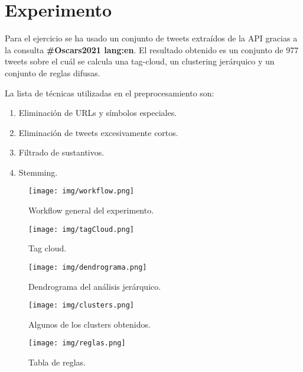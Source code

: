 \documentclass[13pt,a4paper]{article}
\begin{document}
    
    
    \newpage


\section{Experimento}

Para el ejercicio se ha usado un conjunto de tweets extraídos de la API gracias a la consulta \textbf{\#Oscars2021 lang:en}. El resultado obtenido es un conjunto de 977 tweets sobre el cuál se calcula una tag-cloud, un clustering jerárquico y un conjunto de reglas difusas.

\vspace{\baselineskip}

La lista de técnicas utilizadas en el preprocesamiento son:
\begin{enumerate}
    \item Eliminación de URLs y símbolos especiales.
    \item Eliminación de tweets excesivamente cortos.
    \item Filtrado de sustantivos.
    \item Stemming.
\end{enumerate}

\vspace{\baselineskip}

\begin{figure}[H]\center\texttt{[image: img/workflow.png]}\caption{Workflow general del experimento.}\end{figure}

\begin{figure}[H]\center\texttt{[image: img/tagCloud.png]}\caption{Tag cloud.}\end{figure}

\begin{figure}[H]\center\texttt{[image: img/dendrograma.png]}\caption{Dendrograma del análisis jerárquico.}\end{figure}

\begin{figure}[t]\center\texttt{[image: img/clusters.png]}\caption{Algunos de los clusters obtenidos.}\end{figure}

\begin{figure}[b]\center\texttt{[image: img/reglas.png]}\caption{Tabla de reglas.}\end{figure}



    \setlength{\parskip}{1em}
    \newpage
\end{document}
